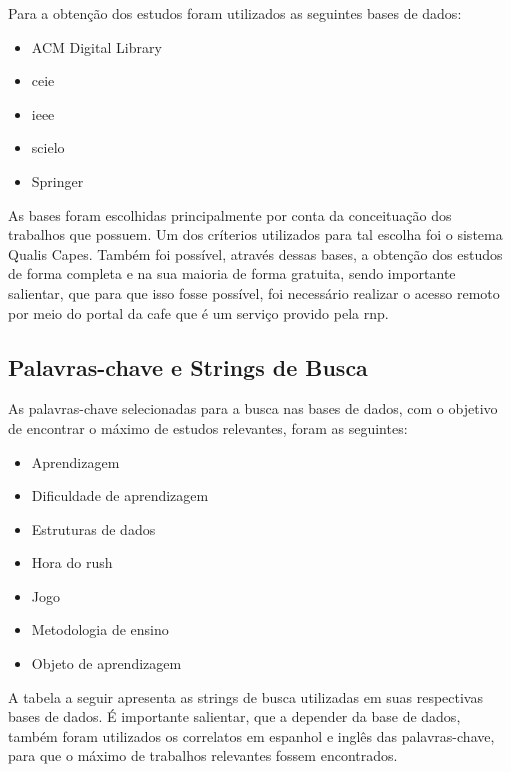 \documentclass[12pt]{article}
\begin{document}
Para a obtenção dos estudos foram utilizados as seguintes bases de dados:
\begin{itemize}
    \item{ACM Digital Library}
    \item{\gls{ceie}}
    \item{\gls{ieee}}
    \item{\gls{scielo}}
    \item{Springer}
\end{itemize}

As bases foram escolhidas principalmente por conta da conceituação dos trabalhos que possuem. Um dos críterios utilizados para tal escolha foi o sistema Qualis Capes. Também foi possível, através dessas bases, a obtenção dos estudos de forma completa e na sua maioria de forma gratuita, sendo importante salientar, que para que isso fosse possível, foi necessário realizar o acesso remoto por meio do portal da \gls{cafe} que é um serviço provido pela \gls{rnp}.

\subsection{Palavras-chave e Strings de Busca}

As palavras-chave selecionadas para a busca nas bases de dados, com o objetivo de encontrar o máximo de estudos relevantes, foram as seguintes:
\begin{itemize}
    \item{Aprendizagem}
    \item{Dificuldade de aprendizagem}
    \item{Estruturas de dados}
    \item{Hora do rush}
    \item{Jogo}
    \item{Metodologia de ensino}
    \item{Objeto de aprendizagem}
\end{itemize}

A tabela a seguir apresenta as strings de busca utilizadas em suas respectivas bases de dados. É importante salientar, que a depender da base de dados, também foram utilizados os correlatos em espanhol e inglês das palavras-chave, para que o máximo de trabalhos relevantes fossem encontrados.
\end{document}

